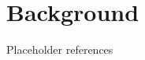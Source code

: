 

\section{Background}


Placeholder references
\cite{koenig2002d}\cite{koenig2002improved}\cite{koenig2004lifelong}\cite{simmons1995probabilistic}